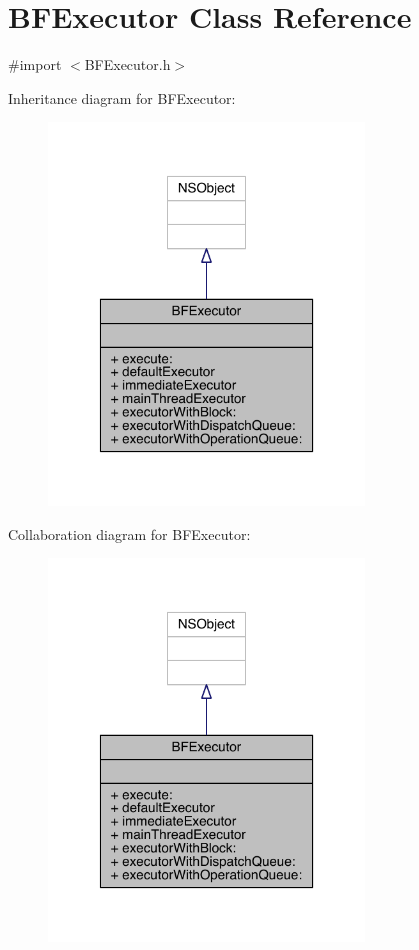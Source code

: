 \hypertarget{interface_b_f_executor}{\section{B\-F\-Executor Class Reference}
\label{interface_b_f_executor}
}


{\ttfamily \#import $<$B\-F\-Executor.\-h$>$}



Inheritance diagram for B\-F\-Executor\-:
\nopagebreak
\begin{figure}[H]
\begin{center}
\leavevmode
\includegraphics[width=238pt]{interface_b_f_executor__inherit__graph}
\end{center}
\end{figure}


Collaboration diagram for B\-F\-Executor\-:
\nopagebreak
\begin{figure}[H]
\begin{center}
\leavevmode
\includegraphics[width=238pt]{interface_b_f_executor__coll__graph}
\end{center}
\end{figure}
